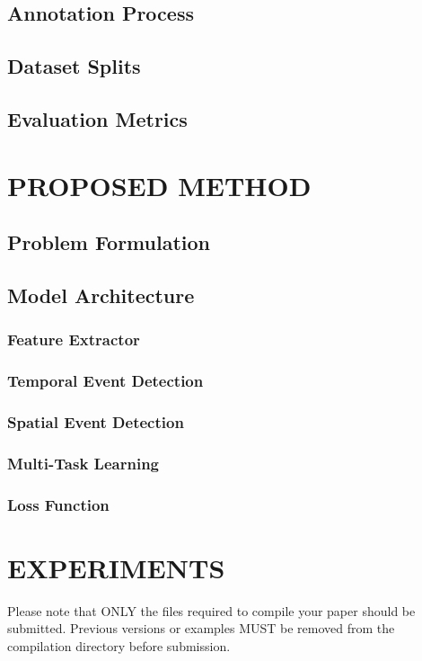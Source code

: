 \documentclass[a4paper,twoside]{article}
\begin{document}
\subsection{Annotation Process}
\subsection{Dataset Splits}
\subsection{Evaluation Metrics}

\section{\uppercase{PROPOSED METHOD}}
\subsection{Problem Formulation}
\subsection{Model Architecture}
\subsubsection{Feature Extractor}
\subsubsection{Temporal Event Detection}
\subsubsection{Spatial Event Detection}
\subsubsection{Multi-Task Learning}
\subsubsection{Loss Function}


\section{\uppercase{EXPERIMENTS}}
\label{sec:experiments}

Please note that ONLY the files required to compile your paper should be submitted. Previous versions or examples MUST be removed from the compilation directory before submission.
\end{document}
